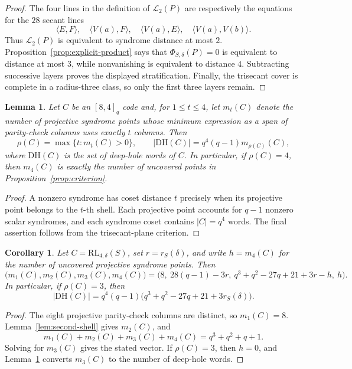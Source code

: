 ﻿\documentclass[11pt]{article}
\newcommand{\RL}{\mathrm{RL}}
\theoremstyle{plain}
\newtheorem{lemma}[theorem]{Lemma}
\newtheorem{corollary}[theorem]{Corollary}
\theoremstyle{definition}
\begin{document}
\begin{proof}
The four lines in the definition of \(\mathcal L_2(P)\) are respectively
the equations for the \(28\) secant lines
\[
 \langle E,F\rangle,\quad
 \langle V(a),F\rangle,\quad
 \langle V(a),E\rangle,\quad
 \langle V(a),V(b)\rangle.
\]
Thus \(\mathcal L_2(P)\) is equivalent to syndrome distance at most \(2\).
Proposition~\ref{prop:explicit-product} says that
\(\Phi_{S,\delta}(P)=0\) is equivalent to distance at most \(3\), while
nonvanishing is equivalent to distance \(4\).  Subtracting successive
layers proves the displayed stratification.  Finally, the trisecant cover is
complete in a radius-three class, so only the first three layers remain.
\end{proof}

\begin{lemma}
\label{lem:deep-census}
Let \(C\) be an \([8,4]_q\) code and, for \(1\le t\le4\), let \(m_t(C)\)
denote the number of projective syndrome points whose minimum expression as a
span of parity-check columns uses exactly \(t\) columns.  Then
\[
  \rho(C)=\max\{t:m_t(C)>0\},
  \qquad
  |\mathrm{DH}(C)|=q^4(q-1)m_{\rho(C)}(C),
\]
where \(\mathrm{DH}(C)\) is the set of deep-hole words of \(C\).
In particular, if \(\rho(C)=4\), then \(m_4(C)\) is exactly the number of
uncovered points in Proposition~\ref{prop:criterion}.
\end{lemma}

\begin{proof}
A nonzero syndrome has coset distance \(t\) precisely when its projective
point belongs to the \(t\)-th shell.  Each projective point accounts for
\(q-1\) nonzero scalar syndromes, and each syndrome coset contains
\(|C|=q^4\) words.  The final assertion follows from the trisecant-plane
criterion.
\end{proof}

\begin{corollary}
\label{cor:closed-shells}
Let \(C=\RL_{4,\delta}(S)\), set \(r=r_S(\delta)\), and write
\(h=m_4(C)\) for the number of uncovered projective syndrome points.  Then
\[
 \bigl(m_1(C),m_2(C),m_3(C),m_4(C)\bigr)
 =
 \bigl(8,\ 28(q-1)-3r,\ q^3+q^2-27q+21+3r-h,\ h\bigr).
\]
In particular, if \(\rho(C)=3\), then
\[
 |\mathrm{DH}(C)|
 =q^4(q-1)\bigl(q^3+q^2-27q+21+3r_S(\delta)\bigr).
\]
\end{corollary}

\begin{proof}
The eight projective parity-check columns are distinct, so \(m_1(C)=8\).
Lemma~\ref{lem:second-shell} gives \(m_2(C)\), and
\[
 m_1(C)+m_2(C)+m_3(C)+m_4(C)=q^3+q^2+q+1.
\]
Solving for \(m_3(C)\) gives the stated vector.  If \(\rho(C)=3\), then
\(h=0\), and Lemma~\ref{lem:deep-census} converts \(m_3(C)\) to
the number of deep-hole words.
\end{proof}
\end{document}
